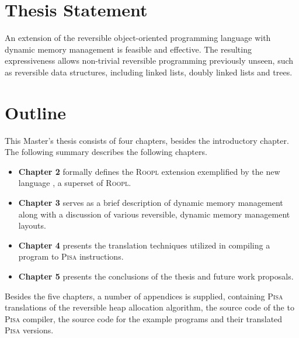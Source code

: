 \section{Thesis Statement}
\label{sec:thesis-statement}
An extension of the reversible object-oriented programming language with dynamic memory management is feasible and effective. The resulting expressiveness allows non-trivial reversible programming previously unseen, such as reversible data structures, including linked lists, doubly linked lists and trees.

\section{Outline}
\label{sec:outline}
This Master's thesis consists of four chapters, besides the introductory chapter. The following summary describes the following chapters.
\begin{itemize}
    \item \textbf{Chapter 2} formally defines the \textsc{Roopl} extension exemplified by the new language \rooplpp, a superset of \textsc{Roopl}.
    \item \textbf{Chapter 3} serves as a brief description of dynamic memory management along with a discussion of various reversible, dynamic memory management layouts.
    \item \textbf{Chapter 4} presents the translation techniques utilized in compiling a \rooplpp program to \textsc{Pisa} instructions.
    \item \textbf{Chapter 5} presents the conclusions of the thesis and future work proposals.
\end{itemize}

Besides the five chapters, a number of appendices is supplied, containing \textsc{Pisa} translations of the reversible heap allocation algorithm, the source code of the \rooplpp to \textsc{Pisa} compiler, the \rooplpp source code for the example programs and their translated \textsc{Pisa} versions.